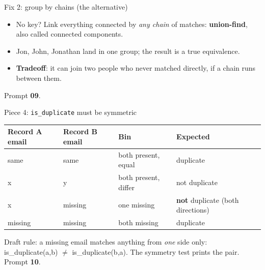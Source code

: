 \begin{frame}{Fix 2: group by chains (the alternative)}
\begin{itemize}
\item No key? Link everything connected by \emph{any chain} of matches: \textbf{union-find}, also called connected components.
\item Jon, John, Jonathan land in one group; the result is a true equivalence.
\item \textbf{Tradeoff}: it can join two people who never matched directly, if a chain runs between them.
\end{itemize}
{\small Prompt \textbf{09}.}
\end{frame}

\begin{frame}{Piece 4: \texttt{is\_duplicate} must be symmetric}
\begin{tabular}{@{}llll@{}}
\textbf{Record A email} & \textbf{Record B email} & \textbf{Bin} & \textbf{Expected}\\\midrule
same & same & both present, equal & duplicate\\
x & y & both present, differ & not duplicate\\
x & missing & one missing & \textbf{not} duplicate (both directions)\\
missing & missing & both missing & duplicate\\
\end{tabular}
\vspace{4pt}

{\small Draft rule: a missing email matches anything from \emph{one} side only: is\_duplicate(a,b) $\neq$ is\_duplicate(b,a). The symmetry test prints the pair. Prompt \textbf{10}.}
\end{frame}

